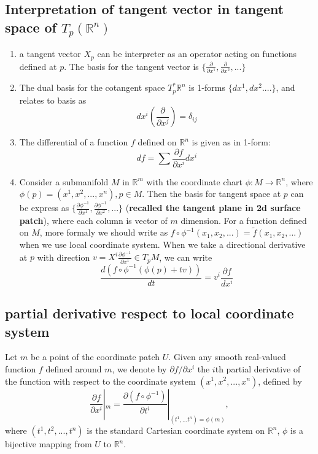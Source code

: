 \begin{refsection}
\subsection{Interpretation of tangent vector in tangent space of $T_p(\mathbb{R}^n)$}
\begin{enumerate}
    \item a tangent vector $X_p$ can be interpreter as an operator acting on functions defined at $p$. The basis for the tangent vector is $\{\frac{\partial}{\partial x^1},\frac{\partial}{\partial x^2},... \}$
    \item The dual basis for the cotangent space $T_p^*{\mathbb{R}^n}$ is 1-forms $\{dx^1,dx^2....\}$, and relates to basis as $$dx^i(\frac{\partial}{\partial x^j}) = \delta_{ij}$$
    \item The differential of a function $f$ defined on $\mathbb{R}^n$ is given as in 1-form: 
    $$df = \sum \frac{\partial f}{\partial x^i} dx^i$$
    \item Consider a submanifold $M$ in $\mathbb{R}^m$ with the coordinate chart $\phi:M \rightarrow \mathbb{R}^n$, where $\phi(p) = (x^1,x^2,...,x^n), p\in M$. Then the basis for tangent space at $p$ can be express as $\{\frac{\partial \phi^{-1}}{\partial x^1},\frac{\partial \phi^{-1}}{\partial x^2},... \}$ (\textbf{recalled the tangent plane in 2d surface patch}), where each column is vector of $m$ dimension. For a function defined on $M$, more formaly we should write as $f\circ \phi^{-1}(x_1,x_2,...) = \tilde{f}(x_1,x_2,...)$ when we use local coordinate system. When we take a directional derivative at $p$ with direction $v= X^i \frac{\partial \phi^{-1}}{\partial x^1} \in T_pM$, we can write
    $$\frac{d (f\circ \phi^{-1}(\phi(p) + t v))}{dt} = v^i\frac{\partial f}{dx^i}$$
    
\end{enumerate}
\subsection{partial derivative respect to local coordinate system}
Let $m$ be a point of the coordinate patch $U$. Given any smooth real-valued function $f$ defined around $m$, we denote by $\partial f / \partial x^i$ the $i$th partial derivative of the function with respect to the coordinate system $(x^1,x^2,...,x^n)$, defined by 
$$\frac{\partial f}{\partial x^i}|_m = \frac{\partial (f\circ \phi^{-1})}{\partial t^i}|_{(t^1,...t^n) = \phi(m)},$$
where $(t^1,t^2,...,t^n)$ is the standard Cartesian coordinate system on $\mathbb{R}^n$, $\phi$ is a bijective mapping from $U$ to $\mathbb{R}^n$.



\end{refsection}
